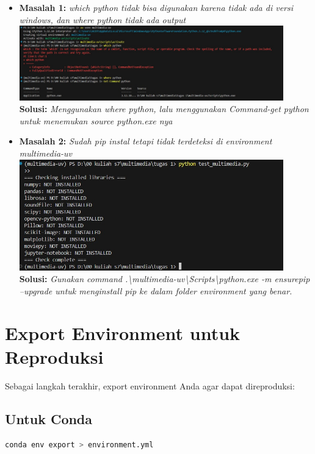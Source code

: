 \documentclass[11pt,a4paper]{article}
\begin{document}
\begin{itemize}
    \item \textbf{Masalah 1:} \textit{which python tidak bisa digunakan karena tidak ada di versi windows, dan where python tidak ada output} \\
    \includegraphics[width=0.9\textwidth]{Figure/ss1.jpg} \\
    \textbf{Solusi:} \textit{Menggunakan where python, lalu menggunakan Command-get python untuk menemukan source python.exe nya}
    
    \item \textbf{Masalah 2:} \textit{Sudah pip instal tetapi tidak terdeteksi di environment multimedia-uv} \\
    \includegraphics[width=0.9\textwidth]{Figure/masalah2.jpg} \\
    
    \textbf{Solusi:} \textit{Gunakan command 
.\textbackslash multimedia-uv\textbackslash Scripts\textbackslash python.exe -m ensurepip --upgrade 
untuk menginstall pip ke dalam folder environment yang benar.}

\end{itemize}

\section{Export Environment untuk Reproduksi}
Sebagai langkah terakhir, export environment Anda agar dapat direproduksi:

\subsection{Untuk Conda}
\begin{lstlisting}[language=bash, caption=Export conda environment]
conda env export > environment.yml
\end{lstlisting}
\end{document}

